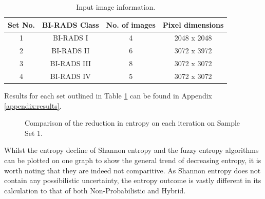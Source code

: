 \begin{table}[H]
  \centering
  \begin{tabular}{|c|c|c|c|}
    \hline
      \textbf{Set No.} & \textbf{BI-RADS Class} & \textbf{No. of images} & \textbf{Pixel dimensions} \\ \hline
      1 & BI-RADS I & 4 & 2048 x 2048 \\ \hline
      2 & BI-RADS II & 6 & 3072 x 3972 \\ \hline
      3 & BI-RADS III & 8 & 3072 x 3072 \\ \hline
      4 & BI-RADS IV & 5 & 3072 x 3072 \\ \hline
  \end{tabular}
  \caption{Input image information.}
  \label{table:image-info}
\end{table}

Results for each set outlined in Table \ref{table:image-info} can be found in Appendix \ref{appendix:results}.

\begin{figure}[H]
  \begin{center}
    \caption{Comparison of the reduction in entropy on each iteration on Sample Set 1.}
    \label{fig:set1-results-all}
  \end{center}
\end{figure}

Whilst the entropy decline of Shannon entropy and the fuzzy entropy algorithms can be plotted on one graph to show the general trend of decreasing entropy, it is worth noting that they are indeed not comparitive. As Shannon entropy does not contain any possibilistic uncertainty, the entropy outcome is vastly different in its calculation to that of both Non-Probabilistic and Hybrid.

